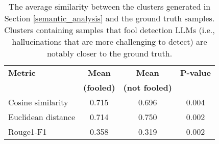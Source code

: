 \begin{table}
\centering
\small
\begin{tabular}{lccc}
\hline
\textbf{Metric} & \textbf{Mean} & \textbf{Mean} & \textbf{P-value} \\
 & \textbf{(fooled)} & \textbf{(not fooled)} & \\
\hline
Cosine similarity & 0.715 & 0.696 & 0.004 \\
Euclidean distance & 0.714 & 0.750 & 0.002 \\
Rouge1-F1 & 0.358 & 0.319 & 0.002 \\
\hline
\end{tabular}
\caption{The average similarity between the clusters generated in Section \ref{semantic_analysis} and the ground truth samples. Clusters containing samples that fool detection LLMs (i.e., hallucinations that are more challenging to detect) are notably closer to the ground truth.}
\label{tab:metrics_cluster}
\end{table}
